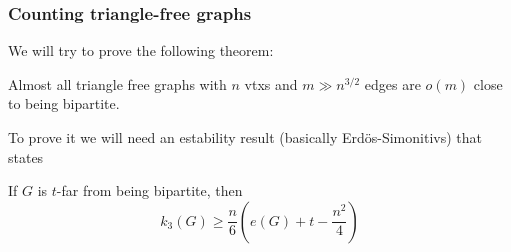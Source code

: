 \subsubsection{Counting triangle-free graphs}

We will try to prove the following theorem:
\begin{theorem}
	\label{containers:far_bipartite}
	Almost all triangle free graphs with $n$ vtxs and $m \gg n^{3/2}$
	edges are $o(m)$ close to being bipartite.
\end{theorem}

To prove it we will need an estability result (basically
Erdös-Simonitivs) that states
\begin{theorem}
	If $G$ is $t$-far from being bipartite, then
	\[
		k_3(G) \geq \frac{n}{6}(e(G) + t - \frac{n^2}{4})
	\]
\end{theorem}

